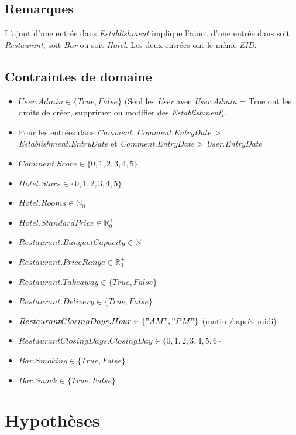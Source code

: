 \documentclass[11pt,a4paper]{report}
\begin{document}
\subsection*{Remarques}
L'ajout d'une entrée dans \textit{Establishment} implique l'ajout d'une entrée dans soit \textit{Restaurant}, soit \textit{Bar} ou soit \textit{Hotel}. Les deux entrées ont le même \textit{EID}.
\subsection*{Contraintes de domaine}
\begin{itemize}
\item $User.Admin \in \{True,False\} $ (Seul les \textit{User} avec \textit{User.Admin} = True ont les droits de créer, supprimer ou modifier des \textit{Establishment}).
\item Pour les entrées dans \textit{Comment}, \textit{Comment.EntryDate > Establishment.EntryDate} et \textit{Comment.EntryDate} > \textit{User.EntryDate}
\item $Comment.Score \in \{0,1,2,3,4,5\}$
\item $Hotel.Stars \in \{0,1,2,3,4,5\}$
\item $Hotel.Rooms \in \mathbb{N}_{0}$
\item $Hotel.StandardPrice \in \mathbb{R}^{+}_{0}$
\item $Restaurant.BanquetCapacity \in \mathbb{N} $
\item $Restaurant.PriceRange \in \mathbb{R}^{+}_{0} $
\item $Restaurant.Takeaway \in \{True,False\} $
\item $Restaurant.Delivery \in \{True,False\} $
\item $RestaurantClosingDays.Hour \in \{"AM","PM"\}$ (matin / après-midi)
\item $RestaurantClosingDays.ClosingDay \in \{0,1,2,3,4,5,6\}$
\item $Bar.Smoking \in \{True,False\} $
\item $Bar.Snack \in \{True,False\} $
\end{itemize}








\section*{Hypothèses}
\noindent
\end{document}
